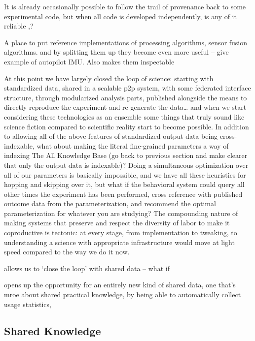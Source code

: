 \documentclass{article}
\begin{document}
It is already occasionally possible to follow the trail of provenance
back to some experimental code, but when all code is developed
independently, is any of it reliable \cite{wallReliabilityStartsExperimental2018},?
\begin{leftbar}
A place to put reference implementations of processing algorithms,
sensor fusion algorithms. and by splitting them up they become even more
useful -- give example of autopilot IMU. Also makes them inspectable
\end{leftbar}

At this point we have largely closed the loop of science: starting with
standardized data, shared in a scalable p2p system, with some federated
interface structure, through modularized analysis parts, published
alongside the means to directly reproduce the experiment and re-generate
the data\ldots{} and when we start considering these technologies as an
ensemble some things that truly sound like science fiction compared to
scientific reality start to become possible. In addition to allowing all
of the above features of standardized output data being cross-indexable,
what about making the literal fine-grained parameters a way of indexing
The All Knowledge Base (go back to previous section and make clearer
that only the output data is indexable)? Doing a simultaneous
optimization over all of our parameters is basically impossible, and we
have all these heuristics for hopping and skipping over it, but what if
the behavioral system could query all other times the experiment has
been performed, cross reference with published outcome data from the
parameterization, and recommend the optimal parameterization for
whatever you are studying? The compounding nature of making systems that
preserve and respect the diversity of labor to make it coproductive is
tectonic: at every stage, from implementation to tweaking, to
understanding a science with appropriate infrastructure would move at
light speed compared to the way we do it now.

\begin{leftbar}
allows us to `close the loop' with shared data -- what if
\end{leftbar}

\begin{leftbar}
opens up the opportunity for an entirely new kind of shared data, one
that's mroe about shared practical knowledge, by being able to
automatically collect usage statistics,
\end{leftbar}

\hypertarget{shared-knowledge}{%
\subsection{Shared Knowledge}\label{shared-knowledge}}
\end{document}
